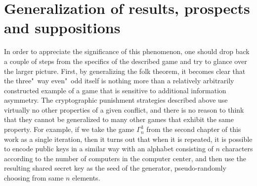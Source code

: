 \section{Generalization of results, prospects and suppositions}\label{sec:ch3/sect6}

In order to appreciate the significance of this phenomenon, one should drop back a couple of steps from the specifics of the described game and try to glance over the larger picture. First, by generalizing the folk theorem, it becomes clear that the three"~way even"~odd itself is nothing more than a relatively arbitrarily constructed example of a game that is sensitive to additional information asymmetry. The cryptographic punishment strategies described above use virtually no other properties of a given conflict, and there is no reason to think that they cannot be generalized to many other games that exhibit the same property. For example, if we take the game $\Gamma^3_n$ from the second chapter of this work as a single iteration, then it turns out that when it is repeated, it is possible to encode public keys in a similar way with an alphabet consisting of $n$ characters according to the number of computers in the computer center, and then use the resulting shared secret key as the seed of the generator, pseudo-randomly choosing from same $n$ elements. %

